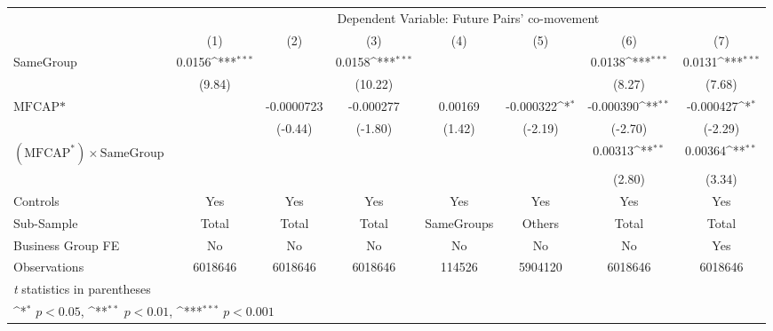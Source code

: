 {
\def\sym#1{\ifmmode^{#1}\else\(^{#1}\)\fi}
\begin{tabular}{l*{7}{c}}
\hline\hline
                &\multicolumn{7}{c}{Dependent Variable: Future Pairs' co-movement}                                                                   \\\cmidrule(lr){2-8}
                &\multicolumn{1}{c}{(1)}         &\multicolumn{1}{c}{(2)}         &\multicolumn{1}{c}{(3)}         &\multicolumn{1}{c}{(4)}         &\multicolumn{1}{c}{(5)}         &\multicolumn{1}{c}{(6)}         &\multicolumn{1}{c}{(7)}         \\
\hline
SameGroup       &   0.0156\sym{***}&                  &   0.0158\sym{***}&                  &                  &   0.0138\sym{***}&   0.0131\sym{***}\\
                &   (9.84)         &                  &  (10.22)         &                  &                  &   (8.27)         &   (7.68)         \\
[1em]
$ \text{MFCAP*}  $&                  &-0.0000723         &-0.000277         &  0.00169         &-0.000322\sym{*}  &-0.000390\sym{**} &-0.000427\sym{*}  \\
                &                  &  (-0.44)         &  (-1.80)         &   (1.42)         &  (-2.19)         &  (-2.70)         &  (-2.29)         \\
[1em]
 $ (\text{MFCAP}^*) \times {\text{SameGroup} }  $ &                  &                  &                  &                  &                  &  0.00313\sym{**} &  0.00364\sym{**} \\
                &                  &                  &                  &                  &                  &   (2.80)         &   (3.34)         \\
\hline
Controls        &      Yes         &      Yes         &      Yes         &      Yes         &      Yes         &      Yes         &      Yes         \\
Sub-Sample      &    Total         &    Total         &    Total         &SameGroups         &   Others         &    Total         &    Total         \\
Business Group FE&       No         &       No         &       No         &       No         &       No         &       No         &      Yes         \\
Observations    &  6018646         &  6018646         &  6018646         &   114526         &  5904120         &  6018646         &  6018646         \\
\hline\hline
\multicolumn{8}{l}{\footnotesize \textit{t} statistics in parentheses}\\
\multicolumn{8}{l}{\footnotesize \sym{*} \(p<0.05\), \sym{**} \(p<0.01\), \sym{***} \(p<0.001\)}\\
\end{tabular}
}
